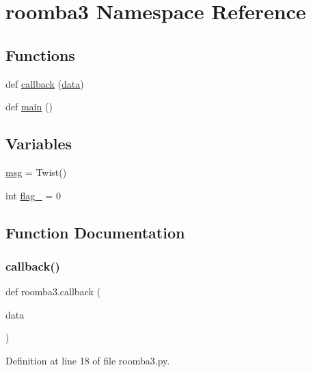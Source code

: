 \hypertarget{namespaceroomba3}{}\section{roomba3 Namespace Reference}
\label{namespaceroomba3}
\subsection*{Functions}
\begin{DoxyCompactItemize}
\item 
def \mbox{\hyperlink{namespaceroomba3_a73bfd19c8d96be1bdf5e098e69664b0e}{callback}} (\mbox{\hyperlink{structdata}{data}})
\item 
def \mbox{\hyperlink{namespaceroomba3_a1a144e93bef005ffc42b17aa11f6fb0a}{main}} ()
\end{DoxyCompactItemize}
\subsection*{Variables}
\begin{DoxyCompactItemize}
\item 
\mbox{\hyperlink{namespaceroomba3_a2974868569b540b2f962795de8163963}{msg}} = Twist()
\item 
int \mbox{\hyperlink{namespaceroomba3_a7dd74f0a9fc8eb831759b5de0a47955f}{flag\+\_}} = 0
\end{DoxyCompactItemize}


\subsection{Function Documentation}
\mbox{\label{namespaceroomba3_a73bfd19c8d96be1bdf5e098e69664b0e}} 
\subsubsection{\texorpdfstring{callback()}{callback()}}
{\footnotesize\ttfamily def roomba3.\+callback (\begin{DoxyParamCaption}\item[{}]{data }\end{DoxyParamCaption})}



Definition at line 18 of file roomba3.\+py.

\mbox{\label{namespaceroomba3_a1a144e93bef005ffc42b17aa11f6fb0a}} 
